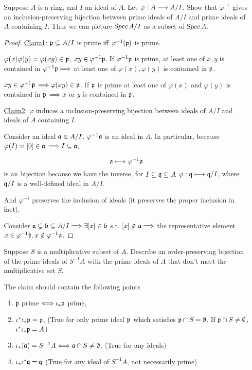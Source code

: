 \documentclass[11pt,fleqn]{book}
\begin{document}
\begin{exr}\label{exr:spec_quotient}
Suppose $A$ is a ring, and $I$ an ideal of $A$. Let $\varphi:A\longrightarrow A/I$. Show that $\varphi^{-1}$ gives an inclusion-preserving bijection between prime ideals of $A/I$ and prime ideals of $A$ containing $I$. Thus we can picture ${\text Spec\,} A/I$ as a subset of ${\text Spec\,} A$.
\end{exr}
\begin{proof}
\underline{Claim1}: ${\mathfrak p}\subseteq A/I$ is prime iff 
$\varphi^{-1}({\mathfrak p})$ is prime.

$\varphi(x)\varphi(y)=\varphi(xy)\in {\mathfrak p}$, $xy\in\varphi^{-1}{\mathfrak p}$. If $\varphi^{-1}{\mathfrak p}$ is prime, at least one of $x,y$ is contained in $\varphi^{-1}{\mathfrak p}\Longrightarrow $ at least one of $\varphi(x),\varphi(y)$ is contained in ${\mathfrak p}$.

$xy\in \varphi^{-1}{\mathfrak p}$ $\Longrightarrow \varphi(xy)\in {\mathfrak p}$. If ${\mathfrak p}$ is prime  at least one of $\varphi(x)$ and $\varphi(y)$ is contained in ${\mathfrak p}$ $\Longrightarrow x$ or $y$ is  contained in ${\mathfrak p}$.

\underline{Claim2}: $\varphi$ induces a inclusion-preserving bijection between ideals of $A/I$ and ideals of $A$ containing $I$.

Consider an ideal ${\mathfrak a}\in A/I$. $\varphi^{-1}{\mathfrak a}$ is  an ideal in $A$. In particular, because $\varphi(I)=[0]\in{\mathfrak a}$ $\Longrightarrow I\subseteq {\mathfrak a}$.

$$
{\mathfrak a}\longmapsto \varphi^{-1}{\mathfrak a}
$$
is an bijection because we have the inverse, for $I\subseteq\mathfrak q\subseteq A$ $\varphi:\mathfrak q\longmapsto \mathfrak q/I$, where $\mathfrak q/I$ is a well-defined ideal in $A/I$.

And $\varphi^{-1}$ preserves the inclusion of ideals (it preserves the proper inclusion in fact). 

Consider ${\mathfrak a}\subsetneq {\mathfrak b}\subseteq A/I\Longrightarrow \exists [x]\in {\mathfrak b}$ s.t. $[x]\notin {\mathfrak a}\Longrightarrow$ the representative element $x\in \varphi^{-1}{\mathfrak b}, x\notin\varphi^{-1}{\mathfrak a}$.
\end{proof}

\begin{exr}\label{exr:spec_localization}
Suppose $S$ is a multiplicative subset of $A$. Describe an order-preserving bijection of the prime ideals of $S^{-1}A$ with the prime ideals of $A$ that don’t meet the multiplicative set $S$.

The claim should contain the following points
\begin{enumerate}[label=(\alph*)]
\item ${\mathfrak p}$ prime $\Longleftrightarrow \iota_*{\mathfrak p}$ prime,
\item $\iota^*\iota_*{\mathfrak p}={\mathfrak p}$, (True for only prime ideal ${\mathfrak p}$ which satisfies ${\mathfrak p}\cap S=\emptyset$. If ${\mathfrak p}\cap S\neq \emptyset$, $\iota^*\iota_*{\mathfrak p}={A}$)
\item $\iota_*({\mathfrak a})= S^{-1}{A}\Longleftrightarrow{\mathfrak a}\cap S\neq \emptyset$, (True for any ideals)
\item  $\iota_*\iota^*\mathfrak q=\mathfrak q$ (True for any ideal of $S^{-1}{A}$, not necessarily prime)
\end{enumerate}
\end{exr}
\end{document}
